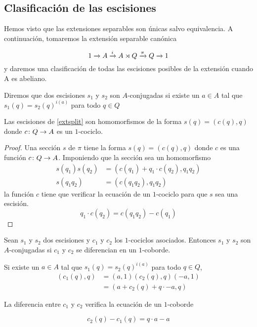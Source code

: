 \subsection{Clasificación de las escisiones}

Hemos visto que las extensiones separables son únicas salvo equivalencia. A continuación, tomaremos la extensión separable canónica

\begin{equation}\label{extsplit}
	\extension i \pi A {A \rtimes Q} Q
\end{equation}
y daremos una clasificación de todas las escisiones posibles de la extensión cuando A es abeliano.

\begin{definicion}
	Diremos que dos escisiones $s_1$ y $s_2$ son $A$-conjugadas si existe un $a\in A$ tal que $s_1(q)=s_2(q)^{i(a)}$ para todo $q\in Q$ %
\end{definicion}

\begin{proposicion}
	Las escisiones de \eqref{extsplit} son homomorfismos de la forma $s(q) = (c(q),q)$ donde $\homo c Q A$ es un $1$-cociclo.
	\begin{proof}
		Una sección $s$ de $\pi$ tiene la forma $s(q) = (c(q),q)$ donde $c$ es una función $\homo c Q A$. Imponiendo que la sección sea un homomorfismo
		\begin{align*}
			s(q_1)s(q_2) &= (c(q_1) + q_1\cdot c(q_2),q_1q_2) \\
			s(q_1q_2) &= (c(q_1q_2),q_1q_2)
		\end{align*}
		la función $c$ tiene que verificar la ecuación de un $1$-cociclo para que $s$ sea una escisión.
		\begin{equation}
			q_1 \cdot c(q_2) = c(q_1q_2) - c(q_1) 
		\end{equation}
	\end{proof}
\end{proposicion}



\begin{proposicion}
	Sean $s_1$ y $s_2$ dos escisiones y $c_1$ y $c_2$ los $1$-cociclos asociados. Entonces $s_1$ y $s_2$ son $A$-conjugadas si $c_1$ y $c_2$ se diferencian en un $1$-coborde.
	\begin{demostracion}
		Si existe un $a \in A$ tal que $s_1(q) = s_2(q)^{i(a)}$ para todo $q\in Q$, 
		\begin{align*}
		(c_1(q),q) &= (a,1)(c_2(q),q)(-a,1) \\
					&= (a  + c_2(q) + q\cdot -a,q)
		\end{align*}
		
		La diferencia entre $c_1$ y $c_2$ verifica la ecuación de un $1$-coborde
		
		\begin{equation}
			c_2(q) - c_1(q) = q\cdot a - a
		\end{equation}
	\end{demostracion}
\end{proposicion}


